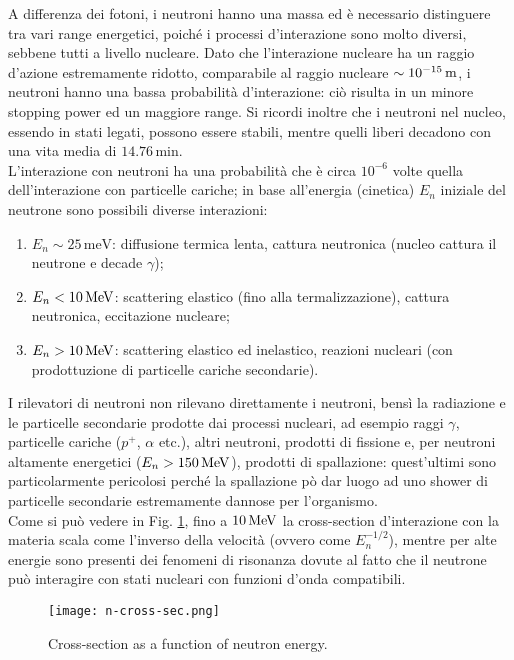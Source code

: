 A differenza dei fotoni, i neutroni hanno una massa ed è necessario distinguere tra vari range energetici, poiché i processi d'interazione sono molto diversi, sebbene tutti a livello nucleare. Dato che l'interazione nucleare ha un raggio d'azione estremamente ridotto, comparabile al raggio nucleare $ \sim 10^{-15} \,\mathrm{m} $, i neutroni hanno una bassa probabilità d'interazione: ciò risulta in un minore stopping power ed un maggiore range. Si ricordi inoltre che i neutroni nel nucleo, essendo in stati legati, possono essere stabili, mentre quelli liberi decadono con una vita media di $ 14.76\,\text{min} $.\\
L'interazione con neutroni ha una probabilità che è circa $ 10^{-6} $ volte quella dell'interazione con particelle cariche; in base all'energia (cinetica) $ E_n $ iniziale del neutrone sono possibili diverse interazioni:
\begin{enumerate}
	\item $ E_n \sim 25 \,\text{meV} $: diffusione termica lenta, cattura neutronica (nucleo cattura il neutrone e decade $ \gamma $);
	\item $ E_n < 10 \,\mathrm{MeV} $: scattering elastico (fino alla termalizzazione), cattura neutronica, eccitazione nucleare;
	\item $ E_n > 10 \,\mathrm{MeV} $: scattering elastico ed inelastico, reazioni nucleari (con prodottuzione di particelle cariche secondarie).
\end{enumerate}
I rilevatori di neutroni non rilevano direttamente i neutroni, bensì la radiazione e le particelle secondarie prodotte dai processi nucleari, ad esempio raggi $ \gamma $, particelle cariche ($ p^+ $, $ \alpha $ etc.), altri neutroni, prodotti di fissione e, per neutroni altamente energetici ($ E_n > 150\,\mathrm{MeV} $), prodotti di spallazione: quest'ultimi sono particolarmente pericolosi perché la spallazione pò dar luogo ad uno shower di particelle secondarie estremamente dannose per l'organismo.\\
Come si può vedere in Fig. \ref{n-cross-sec}, fino a $ 10\,\mathrm{MeV} $ la cross-section d'interazione con la materia scala come l'inverso della velocità (ovvero come $ E_n^{-1/2} $), mentre per alte energie sono presenti dei fenomeni di risonanza dovute al fatto che il neutrone può interagire con stati nucleari con funzioni d'onda compatibili.

\begin{figure}[!t]
	\centering
	\texttt{[image: n-cross-sec.png]}
	\caption{Cross-section as a function of neutron energy.}
	\label{n-cross-sec}
\end{figure}

